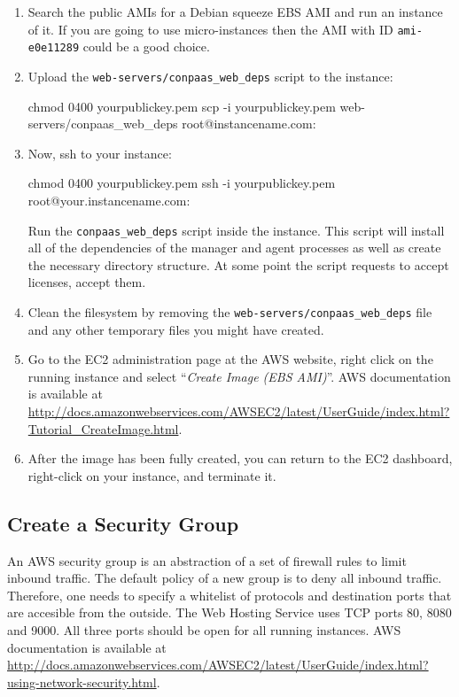 \documentclass[10pt]{article}
\begin{document}
\begin{enumerate}
\item Search the public AMIs for a Debian squeeze EBS AMI and run an
  instance of it. If you are going to use micro-instances then the AMI
  with ID \verb+ami-e0e11289+ could be a good choice.

\item Upload the \verb+web-servers/conpaas_web_deps+ script to the instance:
  \begin{code}
    chmod 0400 yourpublickey.pem
    scp -i yourpublickey.pem web-servers/conpaas_web_deps root@instancename.com:
  \end{code}

\item Now, ssh to your instance:
  \begin{code}
    chmod 0400 yourpublickey.pem
    ssh -i yourpublickey.pem root@your.instancename.com:
  \end{code}
  Run the \verb+conpaas_web_deps+ script inside the instance. This
  script will install all of the dependencies of the manager and agent
  processes as well as create the necessary directory structure. At
  some point the script requests to accept licenses, accept them.

\item Clean the filesystem by removing the
  \verb+web-servers/conpaas_web_deps+ file and any other temporary
  files you might have created.

\item Go to the EC2 administration page at the AWS website, right
  click on the running instance and select ``\emph{Create Image (EBS
    AMI)}''.  AWS
  documentation is available at
  \url{http://docs.amazonwebservices.com/AWSEC2/latest/UserGuide/index.html?Tutorial_CreateImage.html}.

\item After the image has been fully created, you can return to the
  EC2 dashboard, right-click on your instance, and terminate it.
\end{enumerate}

\subsection{Create a Security Group}

An AWS security group is an abstraction of a set of firewall rules to
limit inbound traffic. The default policy of a new group is to deny
all inbound traffic. Therefore, one needs to specify a whitelist of
protocols and destination ports that are accesible from the outside.
The Web Hosting Service uses TCP ports 80, 8080 and 9000. All three
ports should be open for all running instances.  AWS documentation is
available at
\url{http://docs.amazonwebservices.com/AWSEC2/latest/UserGuide/index.html?using-network-security.html}.
\end{document}
